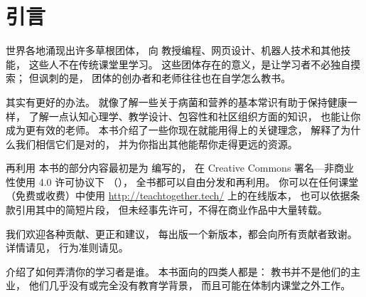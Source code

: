 \chapter{引言}\label{s:intro}

世界各地涌现出许多草根团体，
向
教授编程、网页设计、机器人技术和其他技能，
这些人不在传统课堂里学习。
这些团体存在的意义，是让学习者不必独自摸索；
但讽刺的是，
团体的创办者和老师往往也在自学怎么教书。

其实有更好的办法。
就像了解一些关于病菌和营养的基本常识有助于保持健康一样，
了解一点认知心理学、教学设计、包容性和社区组织方面的知识，
也能让你成为更有效的老师。
本书介绍了一些你现在就能用得上的关键理念，
解释了为什么我们相信它们是对的，
并为你指出其他能帮你走得更远的资源。

\begin{aside}{再利用}
  本书的部分内容最初是为
  编写的，
  在 Creative Commons 署名—非商业性使用 4.0 许可协议下
  （），
  全书都可以自由分发和再利用。
  你可以在任何课堂（免费或收费）中使用
  \url{http://teachtogether.tech/} 上的在线版本，
  也可以依据条款引用其中的简短片段，
  但未经事先许可，不得在商业作品中大量转载。

  我们欢迎各种贡献、更正和建议，
  每出版一个新版本，都会向所有贡献者致谢。
  详情请见，
  行为准则请见。
\end{aside}


介绍了如何弄清你的学习者是谁。
本书面向的四类人都是：
教书并不是他们的主业，
他们几乎没有或完全没有教育学背景，
而且可能在体制内课堂之外工作。


